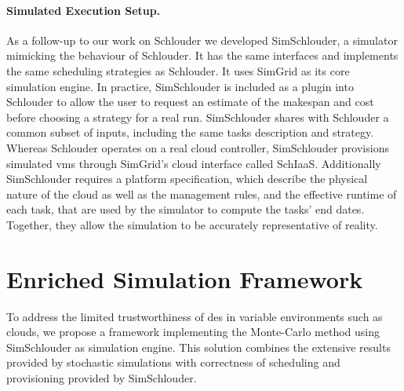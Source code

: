 \documentclass[]{llncs}
\begin{document}
\paragraph{Simulated Execution Setup.}
As a follow-up to our work on Schlouder we developed SimSchlouder, a simulator
mimicking the behaviour of Schlouder. It has the same interfaces and implements
the same scheduling strategies as Schlouder. It uses SimGrid as its core
simulation engine. In practice, SimSchlouder is included as a plugin into
Schlouder to allow the user to request an estimate of the makespan and cost
before choosing a strategy for a real run.
%
SimSchlouder  shares with Schlouder a common subset of inputs, including
the same tasks description and strategy. Whereas Schlouder operates on a
real cloud controller, SimSchlouder provisions simulated \acp{vm} through
SimGrid's cloud interface called SchIaaS. Additionally SimSchlouder requires a
platform specification, which describe the physical nature of the cloud as well
as the management rules, and the effective runtime of each task, that are used
by the simulator to compute the tasks' end dates. Together, they allow the
simulation to be accurately representative of reality.

\section{Enriched Simulation Framework}\label{sec:enriched-sim}


To address the limited trustworthiness of \ac{des} in variable environments such
as clouds, we propose a framework implementing the Monte-Carlo method using 
SimSchlouder as simulation engine. This  solution combines the extensive results
provided  by stochastic simulations with correctness of scheduling and 
provisioning provided by SimSchlouder.
\end{document}
